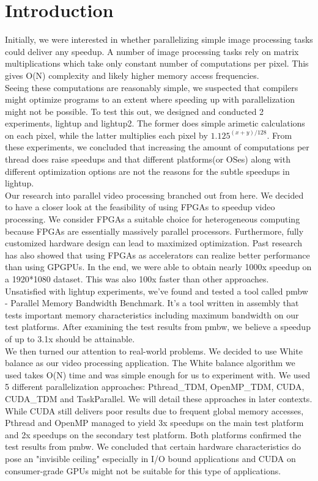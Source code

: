 \documentclass{acm_proc_article-sp}
\begin{document}
\section{Introduction}
Initially, we were interested in whether parallelizing simple image processing tasks could deliver any speedup. A number of image processing tasks rely on matrix multiplications which take only constant number of computations per pixel. This gives O(N) complexity and likely higher memory access frequencies. \\
Seeing these computations are reasonably simple, we suspected that compilers might optimize programs to an extent where speeding up with parallelization might not be possible. To test this out, we designed and conducted 2 experiments, lightup and lightup2. The former does simple arimetic calculations on each pixel, while the latter multiplies each pixel by \(1.125^{(x+y)/128}\). From these experiments, we concluded that increasing the amount of computations per thread does raise speedups and that different platforms(or OSes) along with different optimization options are not the reasons for the subtle speedups in lightup. \\
Our research into parallel video processing branched out from here. We decided to have a closer look at the feasibility of using FPGAs to speedup video processing. We consider FPGAs a suitable choice for heterogeneous computing because FPGAs are essentially massively parallel processors. Furthermore, fully customized hardware design can lead to maximized optimization. Past research has also showed that using FPGAs as accelerators can realize better performance than using GPGPUs. In the end, we were able to obtain nearly 1000x speedup on a 1920*1080 dataset. This was also 100x faster than other approaches. \\
Unsatisfied with lightup experiments, we've found and tested a tool called pmbw - Parallel Memory Bandwidth Benchmark. It's a tool written in assembly that tests important memory characteristics including maximum bandwidth on our test platforms. After examining the test results from pmbw, we believe a speedup of up to 3.1x should be attainable. \\
We then turned our attention to real-world problems. We decided to use White balance as our video processing application. The White balance algorithm we used takes O(N) time and was simple enough for us to experiment with. We used 5 different parallelization approaches: Pthread\_TDM, OpenMP\_TDM, CUDA, CUDA\_TDM and TaskParallel. We will detail these approaches in later contexts. While CUDA still delivers poor results due to frequent global memory accesses, Pthread and OpenMP managed to yield 3x speedups on the main test platform and 2x speedups on the secondary test platform. Both platforms confirmed the test results from pmbw. We concluded that certain hardware characteristics do pose an "invisible ceiling" especially in I/O bound applications and CUDA on consumer-grade GPUs might not be suitable for this type of applications.
\end{document}
